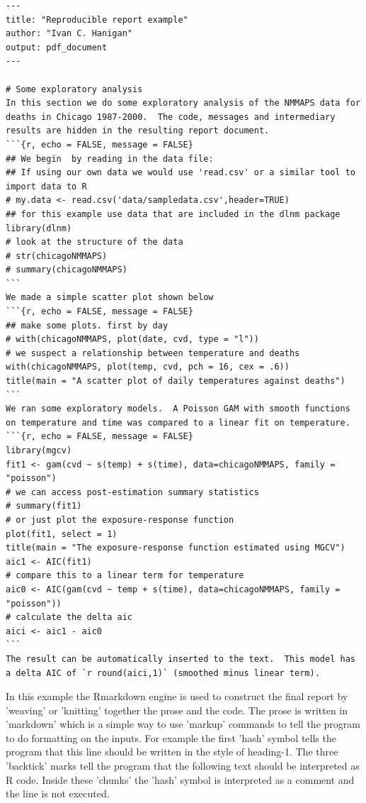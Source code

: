 \documentclass[11pt,a4paper]{article}
\newenvironment{Shaded}{\begin{snugshade}}{\end{snugshade}}
\begin{document}
\begin{singlespace}
\begin{Shaded}
\begin{verbatim}
---
title: "Reproducible report example"
author: "Ivan C. Hanigan"
output: pdf_document
---

# Some exploratory analysis
In this section we do some exploratory analysis of the NMMAPS data for
deaths in Chicago 1987-2000.  The code, messages and intermediary
results are hidden in the resulting report document.
```{r, echo = FALSE, message = FALSE}
## We begin  by reading in the data file:
## If using our own data we would use 'read.csv' or a similar tool to import data to R
# my.data <- read.csv('data/sampledata.csv',header=TRUE)
## for this example use data that are included in the dlnm package
library(dlnm)
# look at the structure of the data
# str(chicagoNMMAPS)
# summary(chicagoNMMAPS)
```
We made a simple scatter plot shown below
```{r, echo = FALSE, message = FALSE}
## make some plots. first by day
# with(chicagoNMMAPS, plot(date, cvd, type = "l"))
# we suspect a relationship between temperature and deaths
with(chicagoNMMAPS, plot(temp, cvd, pch = 16, cex = .6))
title(main = "A scatter plot of daily temperatures against deaths")
```
We ran some exploratory models.  A Poisson GAM with smooth functions
on temperature and time was compared to a linear fit on temperature.
```{r, echo = FALSE, message = FALSE}
library(mgcv)
fit1 <- gam(cvd ~ s(temp) + s(time), data=chicagoNMMAPS, family = "poisson") 
# we can access post-estimation summary statistics
# summary(fit1)
# or just plot the exposure-response function
plot(fit1, select = 1)
title(main = "The exposure-response function estimated using MGCV")
aic1 <- AIC(fit1)
# compare this to a linear term for temperature
aic0 <- AIC(gam(cvd ~ temp + s(time), data=chicagoNMMAPS, family = "poisson"))
# calculate the delta aic
aici <- aic1 - aic0 
```
The result can be automatically inserted to the text.  This model has
a delta AIC of `r round(aici,1)` (smoothed minus linear term).
\end{verbatim}
\end{Shaded}
\end{singlespace}

In this example the Rmarkdown engine is used to construct the final report by 'weaving' or 'knitting' together the prose and the code.  The prose is written in 'markdown' which is a simple way to use 'markup' commands to tell the program to do formatting on the inputs.  For example the first 'hash' symbol tells the program that this line should be written in the style of heading-1.  The three 'backtick' marks tell the program that the following text should be interpreted as R code.  Inside these 'chunks' the 'hash' symbol is interpreted as a comment and the line is not executed.
\end{document}
